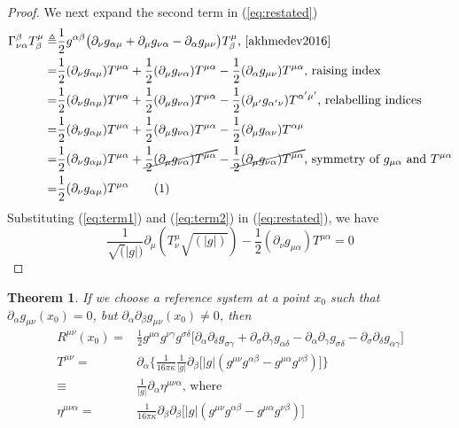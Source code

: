 \documentclass[]{article}
\newtheorem{theorem}{Theorem}
\newcommand\numberthis{\addtocounter{equation}{1}\tag{\theequation}}
\begin{document}
\begin{proof}
	We next expand the second term in (\ref{eq:restated})
	\begin{align*}
	\Gamma^{\beta}_{\nu\alpha}T^{\mu}_{\beta} \triangleq& \frac{1}{2} g^{\alpha\beta} \big( \partial_{\nu}g_{\alpha\mu} + \partial_{\mu}g_{\nu\alpha} - \partial_{\alpha}g_{\mu\nu}\big) T^{\mu}_{\beta}\text{, \cite[(45)]{akhmedev2016}}\\
	=&\frac{1}{2} (\partial_{\nu}g_{\alpha\mu})T^{\mu\alpha} + \frac{1}{2}  (\partial_{\mu}g_{\nu\alpha})T^{\mu\alpha} - \frac{1}{2}  (\partial_{\alpha}g_{\mu\nu}) T^{\mu\alpha}\text{, raising index}\\
	=&\frac{1}{2} (\partial_{\nu}g_{\alpha\mu})T^{\mu\alpha} + \frac{1}{2}  (\partial_{\mu}g_{\nu\alpha})T^{\mu\alpha} - \frac{1}{2}  (\partial_{\mu'}g_{\alpha'\nu}) T^{\alpha'\mu'}\text{, relabelling indices}\\
	=&\frac{1}{2} (\partial_{\nu}g_{\alpha\mu})T^{\mu\alpha} + \frac{1}{2}  (\partial_{\mu}g_{\nu\alpha})T^{\mu\alpha} - \frac{1}{2}  (\partial_{\mu}g_{\alpha\nu}) T^{\alpha\mu}\\
	=&\frac{1}{2} (\partial_{\nu}g_{\alpha\mu})T^{\mu\alpha} + \cancel{\frac{1}{2}  (\partial_{\mu}g_{\nu\alpha})T^{\mu\alpha}} - \cancel{\frac{1}{2}  (\partial_{\mu}g_{\nu\alpha}) T^{\mu\alpha}}\text{, symmetry of $g_{\mu\alpha}$ and $T^{\mu\alpha}$}\\
	=&\frac{1}{2} (\partial_{\nu}g_{\alpha\mu})T^{\mu\alpha} \numberthis\label{eq:term2}
	\end{align*}
	Substituting (\ref{eq:term1}) and (\ref{eq:term2}) in (\ref{eq:restated}), we have
	\begin{equation*}
	\frac{1}{\sqrt(|g|)}\partial_{\mu}(T^{\mu}_{\nu}\sqrt{(|g|)}) - \frac{1}{2}(\partial_{\nu}g_{\mu\alpha})T^{\mu\alpha}=0
	\end{equation*}
\end{proof}

\begin{theorem}
	If we choose a reference system at a point $x_0$ such that $\partial_{\alpha}g_{\mu\nu}(x_0)=0$, but $\partial_{\alpha}\partial_{\beta}g_{\mu\nu}(x_0)\neq0$, then
	\begin{align*}
	R^{\mu\nu}(x_0) = & \frac{1}{2}g^{\mu\alpha}g^{\nu\gamma}g^{\sigma\delta}\big[\partial_{\alpha}\partial_{\delta}g_{\sigma\gamma} + \partial_{\sigma}\partial_{\gamma}g_{\alpha\delta} - \partial_{\alpha}\partial_{\gamma}g_{\sigma\delta} - \partial_{\sigma}\partial_{\delta}g_{\alpha\gamma}\big]\\
	T^{\mu\nu} =& \partial_{\alpha}\bigg\{ \frac{1}{16\pi\kappa}\frac{1}{|g|}\partial_{\beta}\big[|g|(g^{\mu\nu}g^{\alpha\beta}-g^{\mu\alpha}g^{\nu\beta})\big]\bigg\}\\
	\equiv& \frac{1}{|g|}\partial_{\alpha}\eta^{\mu\nu\alpha} \text{, where}\\
	\eta^{\mu\nu\alpha} =& \frac{1}{16\pi\kappa} \partial_{\beta} \partial_{\beta}\big[|g|(g^{\mu\nu}g^{\alpha\beta}-g^{\mu\alpha}g^{\nu\beta})\big]
	\end{align*}
\end{theorem}
\end{document}
